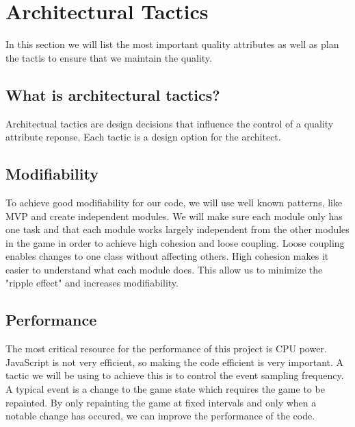 \section{Architectural Tactics}
	In this section we will list the most important quality attributes as well as plan the tactis to 
	ensure that we maintain the quality.

\subsection*{What is architectural tactics? }
Architectual tactics are design decisions that influence the control of a quality attribute reponse. 
Each tactic is a design option for the architect. \cite{architecturalTactics}

\subsection*{Modifiability}
To achieve good modifiability for our code, we will use well known patterns, like MVP and create 
independent modules. We will make sure each module only has one task and that each module works 
largely independent from the other modules in the game in order to achieve high cohesion and loose 
coupling. Loose coupling enables changes to one class without affecting others. High cohesion makes 
it easier to understand what each module does. This allow us to minimize the "ripple effect" and 
increases modifiability.

\subsection*{Performance}
The most critical resource for the performance of this project is CPU power. JavaScript is not very 
efficient, so making the code efficient is very important. A tactic we will be using to achieve this 
is to control the event sampling frequency. A typical event is a change to the game state which 
requires the game to be repainted. By only repainting the game at fixed intervals and only when a 
notable change has occured, we can improve the performance of the code.
